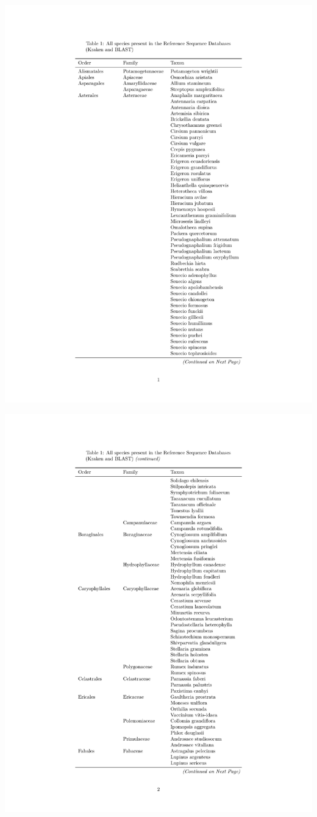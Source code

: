 \documentclass[
]{article}
\begin{document}
\includegraphics{../graphics/assorted/kraken_db_spp_table-1.pdf}

\newpage

\includegraphics{../graphics/assorted/kraken_db_spp_table-2.pdf}
\end{document}
